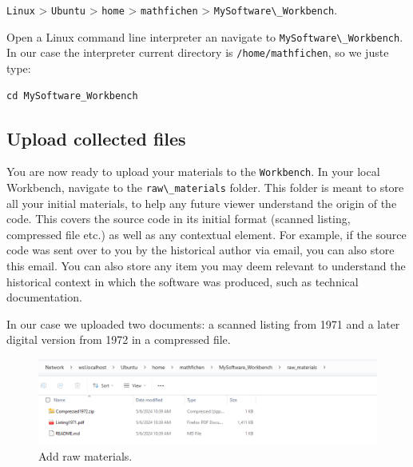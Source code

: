\documentclass[]{article}
\newcommand{\passthrough}[1]{#1}
\begin{document}
\passthrough{\lstinline!Linux!} \textgreater{}
\passthrough{\lstinline!Ubuntu!} \textgreater{}
\passthrough{\lstinline!home!} \textgreater{}
\passthrough{\lstinline!mathfichen!} \textgreater{}
\passthrough{\lstinline!MySoftware\_Workbench!}.

Open a Linux command line interpreter an navigate to
\passthrough{\lstinline!MySoftware\_Workbench!}. In our case the
interpreter current directory is
\passthrough{\lstinline!/home/mathfichen!}, so we juste type:

\begin{lstlisting}
cd MySoftware_Workbench
\end{lstlisting}

\hypertarget{upload-collected-files}{%
\subsection{Upload collected files}\label{upload-collected-files}}

You are now ready to upload your materials to the
\passthrough{\lstinline!Workbench!}. In your local Workbench, navigate
to the \passthrough{\lstinline!raw\_materials!} folder. This folder is
meant to store all your initial materials, to help any future viewer
understand the origin of the code. This covers the source code in its
initial format (scanned listing, compressed file etc.) as well as any
contextual element. For example, if the source code was sent over to you
by the historical author via email, you can also store this email. You
can also store any item you may deem relevant to understand the
historical context in which the software was produced, such as technical
documentation.

In our case we uploaded two documents: a scanned listing from 1971 and a
later digital version from 1972 in a compressed file.

\begin{figure}
\hypertarget{fig:RawMaterials_local}{%
\centering
\includegraphics{./media2/12_AddRawMaterials_local.png}
\caption{Add raw materials.}\label{fig:RawMaterials_local}
}
\end{figure}
\end{document}
